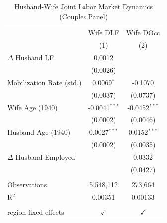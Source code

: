 
\begin{table}[htbp]
   \caption{\label{tab:hwdynamics} Husband-Wife Joint Labor Market Dynamics (Couples Panel)}
   \bigskip
   \centering
   \begin{tabular}{lcc}
      \toprule
                                 & Wife DLF        & Wife DOcc \\   
                                 & (1)             & (2)\\  
      \midrule 
      $\Delta$ Husband LF        & 0.0012          &   \\   
                                 & (0.0026)        &   \\   
      Mobilization Rate (std.)   & 0.0069$^{*}$    & -0.1070\\   
                                 & (0.0037)        & (0.0737)\\   
      Wife Age (1940)            & -0.0041$^{***}$ & -0.0452$^{***}$\\   
                                 & (0.0002)        & (0.0046)\\   
      Husband Age (1940)         & 0.0027$^{***}$  & 0.0152$^{***}$\\   
                                 & (0.0002)        & (0.0035)\\   
      $\Delta$ Husband Employed  &                 & 0.0332\\   
                                 &                 & (0.0427)\\   
       \\
      Observations               & 5,548,112       & 273,664\\  
      R$^2$                      & 0.00351         & 0.00133\\  
       \\
      region fixed effects       & $\checkmark$    & $\checkmark$\\   
      \bottomrule
   \end{tabular}
\end{table}


